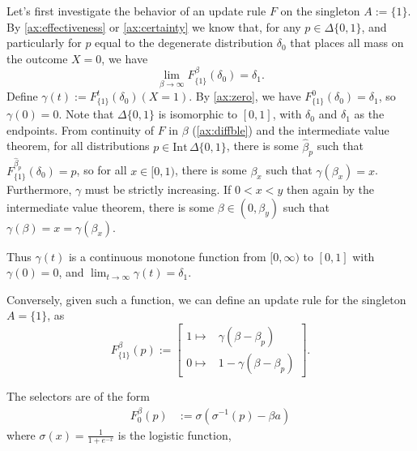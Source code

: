 \documentclass{article}
\begin{document}
\begin{lproof}
    Let's first investigate the behavior of an update rule $F$ on the singleton $A := \{1\}$.
    By \ref{ax:effectiveness} or \cref{ax:certainty} we know that, for any $p \in \Delta\{0,1\}$, and particularly for $p$ equal to the degenerate distribution $\delta_0$ that places all mass on the outcome $X=0$, we have
    \[
        \lim_{\beta \to \infty} F^\beta_{\{1\}}(\delta_0) = \delta_1.
    \]
    Define $\gamma(t) := F^{t}_{\{1\}}(\delta_0)(X=1)$.
    By \cref{ax:zero}, we have $F^0_{\{1\}}(\delta_0) = \delta_1$, so $\gamma(0) = 0$.
    Note that $\Delta\{0,1\}$ is isomorphic to $[0,1]$, with $\delta_0$ and $\delta_1$ as the endpoints.
    From continuity of $F$ in $\beta$ (\cref{ax:diffble}) and the intermediate value theorem, for all distributions $p \in \mathrm{Int}\, \Delta\{0,1\}$, there is some $\hat\beta_p$ such that
    $F^{\hat\beta_p}_{\{1\}}(\delta_0) = p$, so for all $x \in [0,1)$, there is some $\beta_x$ such that $\gamma(\beta_x) = x$.
    Furthermore, $\gamma$ must be strictly increasing.
    If
    $0 < x < y$ then again by the intermediate value theorem, there is some $\beta \in (0, \beta_y)$
    such that $\gamma(\beta) = x = \gamma(\beta_x)$.

    \TODO{}

    Thus $\gamma(t) $ is a continuous monotone function from $[0,\infty)$ to $[0,1]$ with $\gamma(0) = 0$,
    and $\lim_{t\to\infty} \gamma(t) = \delta_1$.


    Conversely, given such a function, we can define an update rule for the singleton $A = \{1\}$, as
    \[
        F^{\beta}_{\{1\}}(p) :=
        \begin{bmatrix}
            1 \mapsto& \gamma(\beta - \beta_p) \\
            0 \mapsto& 1-\gamma(\beta - \beta_p)
        \end{bmatrix}.
    \]
\end{lproof}

The selectors are of the form
\begin{align*}
    F_0^\beta(p) &:= \sigma( \sigma^{-1}(p) - \beta a)
\end{align*}
where $\sigma(x) = \frac{1}{1 + e^{-x}}$ is the logistic function,
\end{document}
